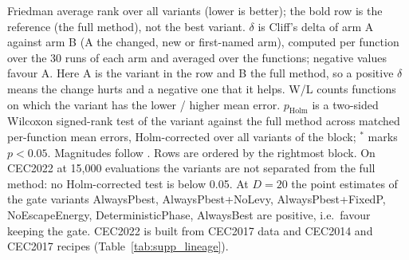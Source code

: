 \begin{table}[htbp]
\begin{flushleft}
Friedman average rank over all variants (lower is better); the bold row is the reference (the full method), not the best variant. $\delta$ is Cliff's delta of arm A against arm B (A the changed, new or first-named arm), computed per function over the 30 runs of each arm and averaged over the functions; negative values favour A. Here A is the variant in the row and B the full method, so a positive $\delta$ means the change hurts and a negative one that it helps. W/L counts functions on which the variant has the lower / higher mean error. $p_{\text{Holm}}$ is a two-sided Wilcoxon signed-rank test of the variant against the full method across matched per-function mean errors, Holm-corrected over all variants of the block; $^{*}$ marks $p<0.05$. Magnitudes follow \citet{romano2006appropriate}. Rows are ordered by the rightmost block. On CEC2022 at 15{,}000 evaluations the variants are not separated from the full method: no Holm-corrected test is below 0.05. At $D=20$ the point estimates of the gate variants AlwaysPbest, AlwaysPbest+NoLevy, AlwaysPbest+FixedP, NoEscapeEnergy, DeterministicPhase, AlwaysBest are positive, i.e.\ favour keeping the gate. CEC2022 is built from CEC2017 data and CEC2014 and CEC2017 recipes (Table~\ref{tab:supp_lineage}).
\end{flushleft}
\end{table}

